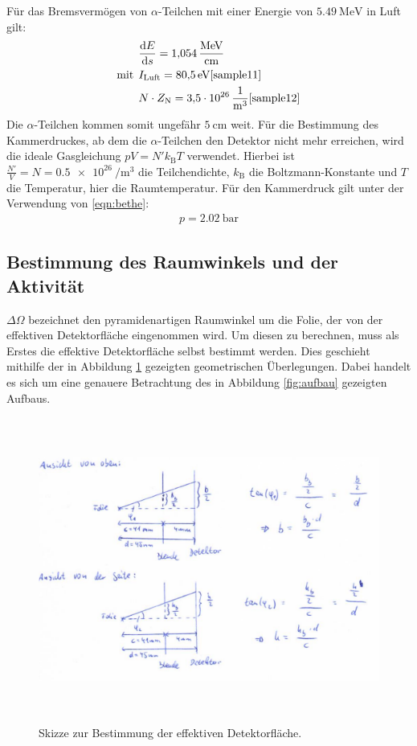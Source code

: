 Für das Bremsvermögen von $\alpha$-Teilchen mit einer Energie von $\SI{5.49}{\mega\eV}$ in Luft gilt:
\begin{align*}
  &\frac{\mathrm{d}E}{\mathrm{d}s} = \SI{1.054}{\mega\eV\per\centi\meter}\\
  \text{mit}\:\: &I_{\mathrm{Luft}} = \SI{80.5}{\eV} \text{\cite{sample11}}\\
  &N\cdot Z_{\mathrm{N}} = \SI{3.5e26}{\per\meter\tothe{3}} \text{\cite{sample12}}
\end{align*}
Die $\alpha$-Teilchen kommen somit ungefähr $\SI{5}{\centi\meter}$ weit.
Für die Bestimmung des Kammerdruckes, ab dem die $\alpha$-Teilchen den Detektor nicht mehr erreichen, wird die
ideale Gasgleichung $pV = N' k_{\mathrm{B}} T$ verwendet. Hierbei ist $\frac{N'}{V}=N= \SI{0.5e26}{\per\meter\tothe3}$ die Teilchendichte,
$k_{\mathrm{B}}$ die Boltzmann-Konstante und $T$ die Temperatur, hier die
Raumtemperatur.
Für den Kammerdruck gilt unter der Verwendung von \ref{eqn:bethe}:
\begin{align*}
  p = \SI{2.02}{\bar}
\end{align*}


\subsection{Bestimmung des Raumwinkels und der Aktivität}

$\Delta \Omega$ bezeichnet den pyramidenartigen Raumwinkel um die Folie, der von
der effektiven Detektorfläche eingenommen wird. Um diesen zu berechnen, muss
als Erstes die effektive Detektorfläche selbst bestimmt werden. Dies geschieht
mithilfe der in Abbildung \ref{fig:skizze} gezeigten geometrischen Überlegungen.
Dabei handelt es sich um eine genauere Betrachtung des in Abbildung \ref{fig:aufbau}
gezeigten Aufbaus.

\begin{figure}[H]
  \centering
  \includegraphics[height=10cm]{Skizze.PNG}
  \caption{Skizze zur Bestimmung der effektiven Detektorfläche.}
  \label{fig:skizze}
\end{figure}

